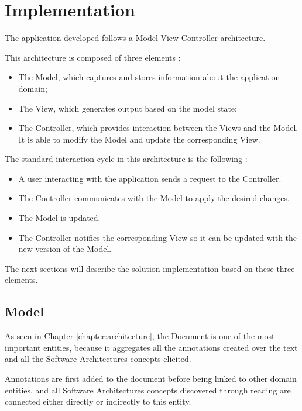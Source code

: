
\chapter{Implementation}
\label{chapter:implementation}

The application developed follows a Model-View-Controller architecture.

This architecture is composed of three elements \cite{krasner1988description}:
\begin{itemize}
\item The Model, which captures and stores information about the application domain;
\item The View, which generates output based on the model state;
\item The Controller, which provides interaction between the Views and the Model. It is able to modify the Model and update the corresponding View.
\end{itemize}

The standard interaction cycle in this architecture is the following \cite{krasner1988description,reenskaug2009dci}:
\begin{itemize}
\item A user interacting with the application sends a request to the Controller.

\item The Controller communicates with the Model to apply the desired changes.

\item The Model is updated.

\item The Controller notifies the corresponding View so it can be updated with the new version of the Model.
\end{itemize}

The next sections will describe the solution implementation based on these three elements.


\section{Model}
As seen in Chapter \ref{chapter:architecture}, the Document is one of the most important entities, because it aggregates all the annotations created over the text and all the Software Architectures concepts elicited.

Annotations are first added to the document before being linked to other domain entities, and all Software Architectures concepts discovered through reading are connected either directly or indirectly to this entity.

